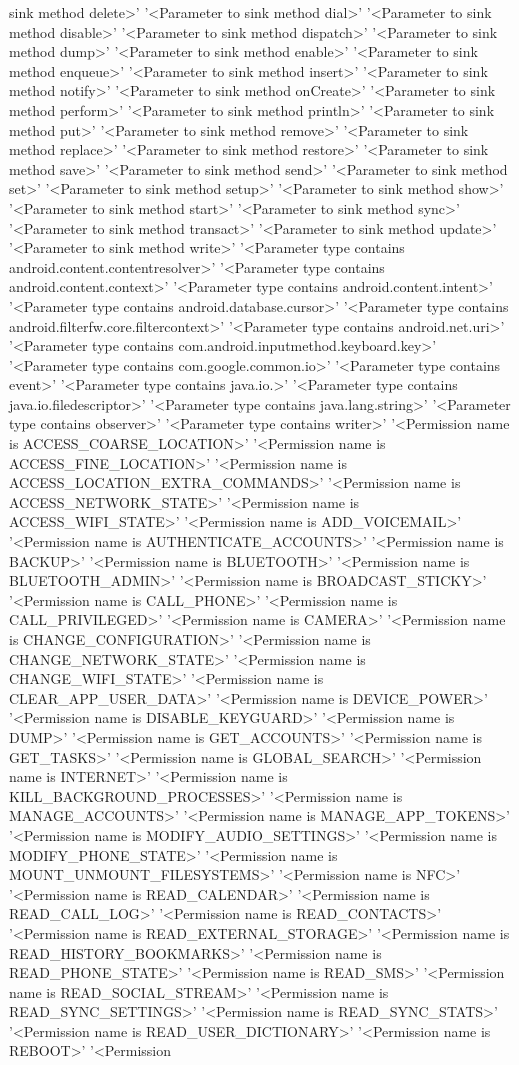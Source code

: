sink method delete>'	'<Parameter to sink method dial>'	'<Parameter to sink method disable>'	'<Parameter to sink method dispatch>'	'<Parameter to sink method dump>'	'<Parameter to sink method enable>'	'<Parameter to sink method enqueue>'	'<Parameter to sink method insert>'	'<Parameter to sink method notify>'	'<Parameter to sink method onCreate>'	'<Parameter to sink method perform>'	'<Parameter to sink method println>'	'<Parameter to sink method put>'	'<Parameter to sink method remove>'	'<Parameter to sink method replace>'	'<Parameter to sink method restore>'	'<Parameter to sink method save>'	'<Parameter to sink method send>'	'<Parameter to sink method set>'	'<Parameter to sink method setup>'	'<Parameter to sink method show>'	'<Parameter to sink method start>'	'<Parameter to sink method sync>'	'<Parameter to sink method transact>'	'<Parameter to sink method update>'	'<Parameter to sink method write>'	'<Parameter type contains android.content.contentresolver>'	'<Parameter type contains android.content.context>'	'<Parameter type contains android.content.intent>'	'<Parameter type contains android.database.cursor>'	'<Parameter type contains android.filterfw.core.filtercontext>'	'<Parameter type contains android.net.uri>'	'<Parameter type contains com.android.inputmethod.keyboard.key>'	'<Parameter type contains com.google.common.io>'	'<Parameter type contains event>'	'<Parameter type contains java.io.>'	'<Parameter type contains java.io.filedescriptor>'	'<Parameter type contains java.lang.string>'	'<Parameter type contains observer>'	'<Parameter type contains writer>'	'<Permission name is ACCESS_COARSE_LOCATION>'	'<Permission name is ACCESS_FINE_LOCATION>'	'<Permission name is ACCESS_LOCATION_EXTRA_COMMANDS>'	'<Permission name is ACCESS_NETWORK_STATE>'	'<Permission name is ACCESS_WIFI_STATE>'	'<Permission name is ADD_VOICEMAIL>'	'<Permission name is AUTHENTICATE_ACCOUNTS>'	'<Permission name is BACKUP>'	'<Permission name is BLUETOOTH>'	'<Permission name is BLUETOOTH_ADMIN>'	'<Permission name is BROADCAST_STICKY>'	'<Permission name is CALL_PHONE>'	'<Permission name is CALL_PRIVILEGED>'	'<Permission name is CAMERA>'	'<Permission name is CHANGE_CONFIGURATION>'	'<Permission name is CHANGE_NETWORK_STATE>'	'<Permission name is CHANGE_WIFI_STATE>'	'<Permission name is CLEAR_APP_USER_DATA>'	'<Permission name is DEVICE_POWER>'	'<Permission name is DISABLE_KEYGUARD>'	'<Permission name is DUMP>'	'<Permission name is GET_ACCOUNTS>'	'<Permission name is GET_TASKS>'	'<Permission name is GLOBAL_SEARCH>'	'<Permission name is INTERNET>'	'<Permission name is KILL_BACKGROUND_PROCESSES>'	'<Permission name is MANAGE_ACCOUNTS>'	'<Permission name is MANAGE_APP_TOKENS>'	'<Permission name is MODIFY_AUDIO_SETTINGS>'	'<Permission name is MODIFY_PHONE_STATE>'	'<Permission name is MOUNT_UNMOUNT_FILESYSTEMS>'	'<Permission name is NFC>'	'<Permission name is READ_CALENDAR>'	'<Permission name is READ_CALL_LOG>'	'<Permission name is READ_CONTACTS>'	'<Permission name is READ_EXTERNAL_STORAGE>'	'<Permission name is READ_HISTORY_BOOKMARKS>'	'<Permission name is READ_PHONE_STATE>'	'<Permission name is READ_SMS>'	'<Permission name is READ_SOCIAL_STREAM>'	'<Permission name is READ_SYNC_SETTINGS>'	'<Permission name is READ_SYNC_STATS>'	'<Permission name is READ_USER_DICTIONARY>'	'<Permission name is REBOOT>'	'<Permission 